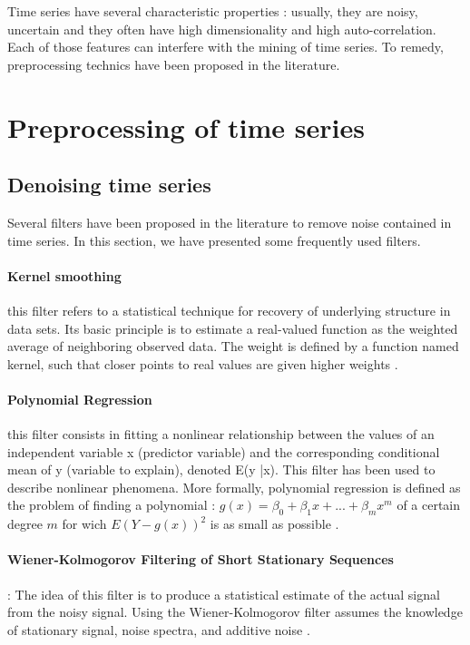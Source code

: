 Time series have several characteristic properties : usually, they are noisy, uncertain and  
they often have high dimensionality and high auto-correlation. Each of those features can interfere with the mining of time series.  To remedy, preprocessing technics have been proposed in the literature.
\section{Preprocessing of time series}


\subsection{Denoising time series}
Several filters have been proposed in the literature to remove noise contained in time series. In this section, we have presented some frequently used filters.
\paragraph{Kernel smoothing} this filter refers to a statistical technique for recovery of underlying structure in data sets. Its basic principle is to estimate a real-valued function as the weighted average of neighboring observed data. The weight is defined by a function named kernel, such that closer points to real values are given higher weights \cite{wand1994kernel}.

\paragraph{Polynomial Regression} this filter consists in fitting a nonlinear relationship between the values of an independent variable x (predictor variable)  and the corresponding conditional mean of y (variable to explain), denoted E(y |x). This filter has been used to describe nonlinear phenomena. More formally, polynomial regression is defined as the problem of finding a polynomial :  $g(x)=\beta_{0}+\beta_{1}x+...+\beta_{m}x^{m}$ of a certain degree $m$ for wich $E(Y-g(x))^{2}$ is as small as possible \cite{kendall1961advanced}.

\paragraph{Wiener-Kolmogorov Filtering of Short Stationary Sequences} : 
The idea of this filter is to produce a statistical estimate of the actual signal from the noisy signal. Using the Wiener-Kolmogorov filter assumes the knowledge of stationary signal, noise spectra, and additive noise \cite{pollock2007wiener}.

